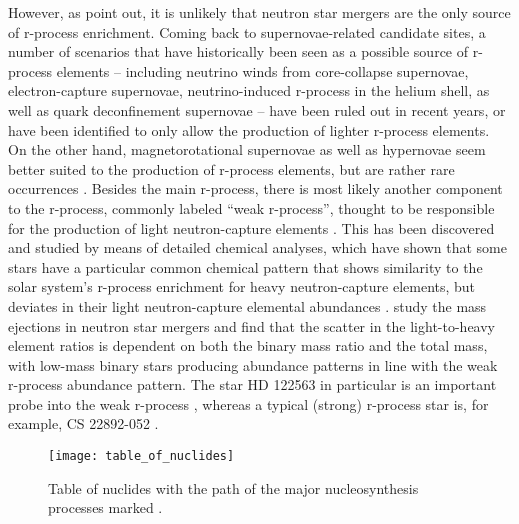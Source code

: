 \documentclass[a4paper,11pt]{article}
\begin{document}
However, as \citet{skuladottir19} point out, it is unlikely that neutron star mergers are the only source of r-process enrichment. Coming back to supernovae-related candidate sites, a number of scenarios that have historically been seen as a possible source of r-process elements -- including neutrino winds from core-collapse supernovae, electron-capture supernovae, neutrino-induced r-process in the helium shell, as well as quark deconfinement supernovae -- have been ruled out in recent years, or have been identified to only allow the production of lighter r-process elements. On the other hand, magnetorotational supernovae as well as hypernovae seem better suited to the production of r-process elements, but are rather rare occurrences \citep{cowan21}. Besides the main r-process, there is most likely another component to the r-process, commonly labeled ``weak r-process'', thought to be responsible for the production of light neutron-capture elements \citep[see, e.g.,][]{wanajo06,truran02}. This has been discovered and studied by means of detailed chemical analyses, which have shown that some stars have a particular common chemical pattern that shows similarity to the solar system's r-process enrichment for heavy neutron-capture elements, but deviates in their light neutron-capture elemental abundances \citep{sneden00}. \citet{fujibayashi23,fujibayashi20} study the mass ejections in neutron star mergers and find that the scatter in the light-to-heavy element ratios is dependent on both the binary mass ratio and the total mass, with low-mass binary stars producing abundance patterns in line with the weak r-process abundance pattern. The star HD 122563 in particular is an important probe into the weak r-process \citep{honda06}, whereas a typical (strong) r-process star is, for example, CS 22892-052 \citep{sneden03}.
%
\begin{figure}
 \centering
 \texttt{[image: table\_of\_nuclides]}
 \caption[Nuclear chart with nucleosynthesis processes]{Table of nuclides with the path of the major nucleosynthesis processes marked \citep{thielemann23}.}
 \label{fig:nuclearchart}
\end{figure}\\ \\
%
\end{document}
